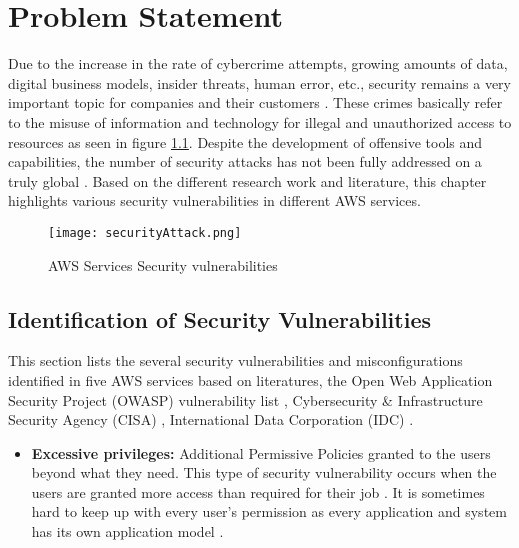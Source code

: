 
\chapter{Problem Statement}

\par Due to the increase in the rate of cybercrime attempts, growing amounts of data, digital business models, insider threats, human error, etc., security remains a very important topic for companies and their customers \cite{40}.  These crimes basically refer to the misuse of information and technology for illegal and unauthorized access to resources as seen in figure \ref{fig:securityAttack}. Despite the development of offensive tools and capabilities, the number of security attacks has not been fully addressed on a truly global \cite{38}. Based on the different research work and literature, this chapter highlights various security vulnerabilities in different AWS services.

\begin{figure}
    \centering
    \texttt{[image: securityAttack.png]}
    \caption{AWS Services Security vulnerabilities}
    \label{fig:securityAttack}
\end{figure}

\section{Identification of Security Vulnerabilities}

\par This section lists the several security vulnerabilities and misconfigurations identified in five AWS services
based on literatures, the Open Web Application Security Project (OWASP) vulnerability list \cite{43}, Cybersecurity
\& Infrastructure Security Agency (CISA) \cite{42}, International Data Corporation (IDC) \cite{41}.


\begin{itemize}
    \item \textbf{Excessive privileges:} Additional Permissive Policies granted to the users beyond what they need.
    This type
    of security vulnerability occurs when the users are granted more access than required for their job \cite{44}. It is
    sometimes hard to keep up with every user’s permission as every application and system has its own application
    model \cite{45}.
\end{itemize}

